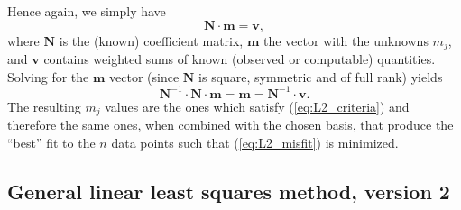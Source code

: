 Hence again, we simply have
\begin{equation}
\mathbf{N \cdot m = v},
\label{eq:Nxvsolution}
\end{equation}
where $\mathbf{N}$ is the (known) coefficient matrix, $\mathbf{m}$ the vector with the unknowns $m_j$, and $\mathbf{v}$ contains 
weighted sums of known (observed or computable) quantities. Solving for the $\mathbf{m}$ vector (since $\mathbf{N}$ is square, symmetric and 
of full rank) yields
\begin{equation}
\mathbf{N}^{-1} \cdot \mathbf{N \cdot m} = \mathbf{m} = \mathbf{N}^{-1} \cdot \mathbf{v}.
\end{equation}	 
The resulting $m_j$ values are the ones which satisfy (\ref{eq:L2_criteria}) and 
therefore the same ones, when combined with the chosen basis, that produce the ``best'' fit to the 
$n$ data points such that (\ref{eq:L2_misfit}) is minimized.

\subsection{General linear least squares method, version 2}

